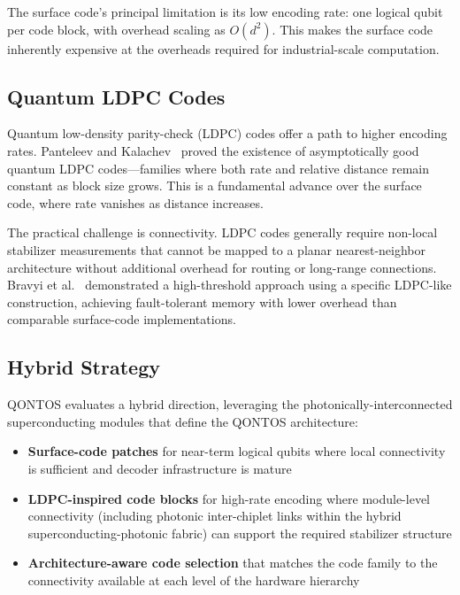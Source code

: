 \documentclass[conference]{IEEEtran}
\begin{document}
The surface code's principal limitation is its low encoding rate: one logical qubit per code block, with overhead scaling as $O(d^2)$. This makes the surface code inherently expensive at the overheads required for industrial-scale computation.

\subsection{Quantum LDPC Codes}

Quantum low-density parity-check (LDPC) codes offer a path to higher encoding rates. Panteleev and Kalachev~\cite{panteleev2022} proved the existence of asymptotically good quantum LDPC codes---families where both rate and relative distance remain constant as block size grows. This is a fundamental advance over the surface code, where rate vanishes as distance increases.

The practical challenge is connectivity. LDPC codes generally require non-local stabilizer measurements that cannot be mapped to a planar nearest-neighbor architecture without additional overhead for routing or long-range connections. Bravyi et al.~\cite{bravyi2024} demonstrated a high-threshold approach using a specific LDPC-like construction, achieving fault-tolerant memory with lower overhead than comparable surface-code implementations.

\subsection{Hybrid Strategy}

QONTOS evaluates a hybrid direction, leveraging the photonically-interconnected superconducting modules that define the QONTOS architecture:

\begin{itemize}
\item \textbf{Surface-code patches} for near-term logical qubits where local connectivity is sufficient and decoder infrastructure is mature
\item \textbf{LDPC-inspired code blocks} for high-rate encoding where module-level connectivity (including photonic inter-chiplet links within the hybrid superconducting-photonic fabric) can support the required stabilizer structure
\item \textbf{Architecture-aware code selection} that matches the code family to the connectivity available at each level of the hardware hierarchy
\end{itemize}
\end{document}
